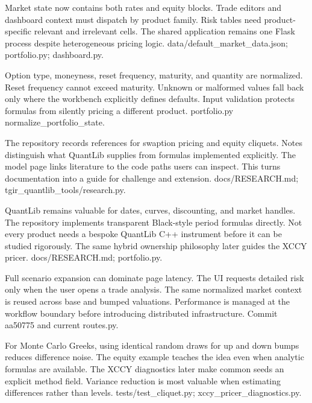 {Market state now contains both rates and equity blocks.}
{Trade editors and dashboard context must dispatch by product family.}
{Risk tables need product-specific relevant and irrelevant cells.}
{The shared application remains one Flask process despite heterogeneous pricing logic.}
{data/default\_market\_data.json; portfolio.py; dashboard.py.}

{Option type, moneyness, reset frequency, maturity, and quantity are normalized.}
{Reset frequency cannot exceed maturity.}
{Unknown or malformed values fall back only where the workbench explicitly defines defaults.}
{Input validation protects formulas from silently pricing a different product.}
{portfolio.py normalize\_portfolio\_state.}

{The repository records references for swaption pricing and equity cliquets.}
{Notes distinguish what QuantLib supplies from formulas implemented explicitly.}
{The model page links literature to the code paths users can inspect.}
{This turns documentation into a guide for challenge and extension.}
{docs/RESEARCH.md; tgir\_quantlib\_tools/research.py.}

{QuantLib remains valuable for dates, curves, discounting, and market handles.}
{The repository implements transparent Black-style period formulas directly.}
{Not every product needs a bespoke QuantLib C++ instrument before it can be studied rigorously.}
{The same hybrid ownership philosophy later guides the XCCY pricer.}
{docs/RESEARCH.md; portfolio.py.}

{Full scenario expansion can dominate page latency.}
{The UI requests detailed risk only when the user opens a trade analysis.}
{The same normalized market context is reused across base and bumped valuations.}
{Performance is managed at the workflow boundary before introducing distributed infrastructure.}
{Commit aa50775 and current routes.py.}

{For Monte Carlo Greeks, using identical random draws for up and down bumps reduces difference noise.}
{The equity example teaches the idea even when analytic formulas are available.}
{The XCCY diagnostics later make common seeds an explicit method field.}
{Variance reduction is most valuable when estimating differences rather than levels.}
{tests/test\_cliquet.py; xccy\_pricer\_diagnostics.py.}


